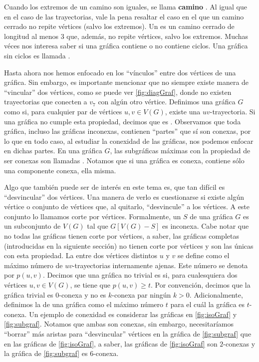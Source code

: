 Cuando los extremos de un camino son iguales, se llama \textbf{camino}
. Al igual que en el caso de las trayectorias, vale
la pena resaltar el caso en el que un camino cerrado no repite v\'ertices (salvo
los extremos). Un  es un camino cerrado de longitud al menos $3$
que, adem\'as, no repite v\'ertices, salvo los extremos.  Muchas v\'eces nos
interesa saber si una gr\'afica contiene o no contiene ciclos.   Una gr\'afica
sin ciclos es llamada .
   
Hasta ahora nos hemos enfocado en los ``v\'inculos'' entre dos v\'ertices de una
gr\'afica. Sin embargo, es importante mencionar que no siempre existe manera de
``vincular'' dos v\'ertices, como se puede ver \cref{fig:diagGraf}, donde no
existen trayectorias que conecten a $v_7$ con alg\'un otro v\'ertice.  Definimos
una gr\'afica $G$ como  si,
para cualquier par de v\'ertices $u,v \in V(G)$, existe una $uv$-trayectoria. Si
una gr\'afica no cumple esta propiedad, decimos que es
. Observamos que toda gr\'afica, incluso las
gr\'aficas inconexas, contienen ``partes'' que s\'i son conexas, por lo que en
todo caso, al estudiar la conexidad de las gr\'aficas, nos podemos enfocar en
dichas partes. En una gr\'afica $G$, las subgr\'aficas m\'aximas con la
propiedad de ser conexas son llamadas . Notamos que si una gr\'afica es conexa,
contiene s\'olo una componente conexa, ella misma. 

Algo que tambi\'en puede ser de inter\'es en este tema es, que tan dif\'icil es
``desvincular'' dos v\'ertices. Una manera de verlo es cuestionarse si existe
alg\'un v\'ertice o conjunto de v\'ertices que, al quitarlo, ``desvincule'' a
los v\'ertices. A este conjunto lo llamamos corte por v\'ertices. Formalmente,
un  $S$ de una gr\'afica $G$ es un subconjunto de
$V(G)$ tal que $G[V(G)-S]$ es inconexa. Cabe notar que no todas las gr\'aficas
tienen corte por v\'ertices, a saber, las gr\'aficas completas (introducidas en
la siguiente secci\'on) no tienen corte por v\'ertices y son las \'unicas con
esta propiedad.
La  entre dos v\'ertices distintos $u$ y $v$ se define
como el m\'aximo n\'umero de $uv$-trayectorias internamente ajenas. Este
n\'umero se denota por $p(u,v)$. Decimos que una gr\'afica no trivial es
 si, para cualesquiera dos v\'ertices $u,v \in
V(G)$, se tiene que $p(u,v) \geq t$. Por convenci\'on, decimos que la gr\'afica
trivial es $0$-conexa y no es $k$-conexa par ning\'un $k > 0$. Adicionalmente,
definimos la  de una gr\'afica como el m\'aximo n\'umero $t$
para el cu\'al la gr\'afica es $t$-conexa. Un ejemplo de conexidad es considerar
las gr\'aficas en \cref{fig:isoGraf} y \cref{fig:subgraf}. Notamos que ambas son
conexas, sin embargo, necesitar\'iamos ``borrar'' m\'as aristas para
``desvincular'' v\'ertices en la gr\'afica de \cref{fig:subgraf} que en las
gr\'aficas de \cref{fig:isoGraf}, a saber, las gr\'aficas de \cref*{fig:isoGraf}
son $2$-conexas y la gr\'afica de \cref{fig:subgraf} es $6$-conexa.

